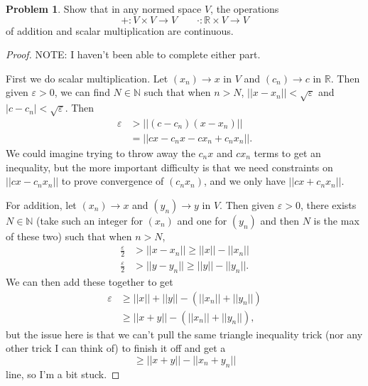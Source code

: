 \documentclass[12pt]{article}
\theoremstyle{definition}
\newtheorem{ex}{Problem}
\begin{document}
\begin{ex}
	Show that in any normed space $V$, the operations \begin{equation*}
		+ : V \times V \to V \hspace{2em} \cdot : \mathbb{R} \times V \to V
	\end{equation*}
	of addition and scalar multiplication are continuous.
\end{ex}
\begin{proof}
	NOTE: I haven't been able to complete either part.

	First we do scalar multiplication.
	Let $(x_n) \to x$ in $V$ and $(c_n) \to c$ in $\mathbb{R}$.
	Then given $\varepsilon > 0$, we can find $N \in \mathbb{N}$ such that when $n > N$, $||x - x_n|| < \sqrt{\varepsilon}$ and $|c - c_n| < \sqrt{\varepsilon}$.
	Then \begin{align*}
		\varepsilon & > ||(c-c_n)(x-x_n)||             \\
		            & = ||cx - c_nx - cx_n + c_nx_n||.
	\end{align*}
	We could imagine trying to throw away the $c_nx$ and $cx_n$ terms to get an inequality, but the more important difficulty is that we need constraints on $||cx - c_nx_n||$ to prove convergence of $(c_nx_n)$, and we only have $||cx+c_nx_n||$.

	For addition, let $(x_n) \to x$ and $(y_n) \to y$ in $V$.
	Then given $\varepsilon > 0$, there exists $N \in \mathbb{N}$ (take such an integer for $(x_n)$ and one for $(y_n)$ and then $N$ is the max of these two) such that when $n > N$, \begin{align*}
		\frac{\varepsilon}{2} & > ||x - x_n|| \geq ||x|| - ||x_n||  \\
		\frac{\varepsilon}{2} & > ||y - y_n|| \geq ||y|| - ||y_n||.
	\end{align*}
	We can then add these together to get \begin{align*}
		\varepsilon & \geq ||x|| + ||y|| - (||x_n|| + ||y_n||) \\
		            & \geq ||x + y|| - (||x_n|| + ||y_n||),
	\end{align*}
	but the issue here is that we can't pull the same triangle inequality trick (nor any other trick I can think of) to finish it off and get a \begin{equation*}
		\geq ||x + y|| - ||x_n + y_n||
	\end{equation*}
	line, so I'm a bit stuck.
\end{proof}
\end{document}
